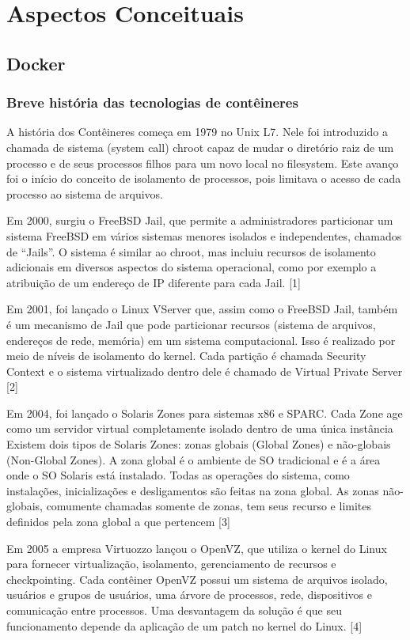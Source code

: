 \documentclass[]{politex}
\begin{document}
\chapter{Aspectos Conceituais}
	\section{Docker}
	\subsection{Breve história das tecnologias de contêineres}
	A história dos Contêineres começa em 1979 no Unix L7. Nele foi introduzido a chamada de sistema (system call) chroot capaz de mudar o diretório raiz de um processo e de seus processos filhos para um novo local no filesystem. Este avanço foi o início do conceito de isolamento de processos, pois limitava o acesso de cada processo ao sistema de arquivos. 

	Em 2000, surgiu o FreeBSD Jail, que permite a administradores particionar um sistema FreeBSD em vários sistemas menores isolados e independentes, chamados de “Jails”. O sistema é similar ao chroot, mas incluiu recursos de isolamento adicionais em diversos aspectos do sistema operacional, como por exemplo a atribuição de um endereço de IP diferente para cada Jail. [1]

	Em 2001, foi lançado o Linux VServer que, assim como o FreeBSD Jail, também é um mecanismo de Jail que pode particionar recursos (sistema de arquivos, endereços de rede, memória) em um sistema computacional. Isso é realizado por meio de níveis de isolamento do kernel. Cada partição é chamada Security Context e o sistema virtualizado dentro dele é chamado de Virtual Private Server [2]

	Em 2004, foi lançado o Solaris Zones para sistemas x86 e SPARC. Cada Zone age como um servidor virtual completamente isolado dentro de uma única instância Existem dois tipos de Solaris Zones: zonas globais (Global Zones) e não-globais (Non-Global Zones). A zona global é o ambiente de SO tradicional e é a área onde o SO Solaris está instalado. Todas as operações do sistema, como instalações, inicializações e desligamentos são feitas na zona global. As zonas não-globais, comumente chamadas somente de zonas, tem seus recurso e limites definidos pela zona global a que pertencem  [3]

	Em 2005 a empresa Virtuozzo lançou o OpenVZ, que utiliza o kernel do Linux para fornecer virtualização, isolamento, gerenciamento de recursos e checkpointing. Cada contêiner OpenVZ possui um sistema de arquivos isolado, usuários e grupos de usuários, uma árvore de processos, rede, dispositivos e comunicação entre processos. Uma desvantagem da solução é que seu funcionamento depende da aplicação de um patch no kernel do Linux. [4]
\end{document}

